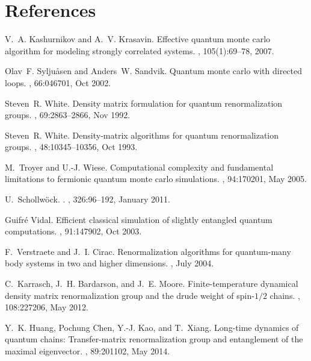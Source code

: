 \documentclass[preprint,3p,times,preprint,showpacs,amsmath,superscriptaddress,floatfix]{elsarticle}
\begin{document}
\section*{References}
%
%
\begin{thebibliography}{10}

V.~A. Kashurnikov and A.~V. Krasavin.
\newblock Effective quantum monte carlo algorithm for modeling strongly
  correlated systems.
, 105(1):69--78,
  2007.

Olav~F. Sylju\aa{}sen and Anders~W. Sandvik.
\newblock Quantum monte carlo with directed loops.
, 66:046701, Oct 2002.

Steven~R. White.
\newblock Density matrix formulation for quantum renormalization groups.
, 69:2863--2866, Nov 1992.

Steven~R. White.
\newblock Density-matrix algorithms for quantum renormalization groups.
, 48:10345--10356, Oct 1993.

M.~Troyer and U.-J. Wiese.
\newblock Computational complexity and fundamental limitations to fermionic
  quantum monte carlo simulations.
, 94:170201, May 2005.

U.~{Schollw{\"o}ck}.
.
, 326:96--192, January 2011.

Guifr\'e Vidal.
\newblock Efficient classical simulation of slightly entangled quantum
  computations.
, 91:147902, Oct 2003.

F.~{Verstraete} and J.~I. {Cirac}.
\newblock Renormalization algorithms for quantum-many body systems in two and
  higher dimensions.
, July 2004.

C.~Karrasch, J.~H. Bardarson, and J.~E. Moore.
\newblock Finite-temperature dynamical density matrix renormalization group and
  the drude weight of spin-$1/2$ chains.
, 108:227206, May 2012.

Y.~K. Huang, Pochung Chen, Y.-J. Kao, and T.~Xiang.
\newblock Long-time dynamics of quantum chains: Transfer-matrix renormalization
  group and entanglement of the maximal eigenvector.
, 89:201102, May 2014.


\end{thebibliography}
\end{document}

